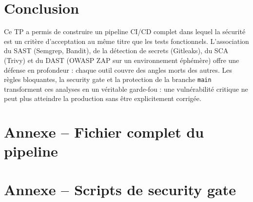 \documentclass[11pt,a4paper]{article}
\begin{document}
\section{Conclusion}

Ce TP a permis de construire un pipeline CI/CD complet dans lequel la sécurité est un critère
d'acceptation au même titre que les tests fonctionnels. L'association du SAST (Semgrep, Bandit), de
la détection de secrets (Gitleaks), du SCA (Trivy) et du DAST (OWASP ZAP sur un environnement
éphémère) offre une défense en profondeur : chaque outil couvre des angles morts des autres. Les
règles bloquantes, la security gate et la protection de la branche \texttt{main} transforment ces
analyses en un véritable garde-fou : une vulnérabilité critique ne peut plus atteindre la
production sans être explicitement corrigée.

\appendix
\section{Annexe -- Fichier complet du pipeline}


\section{Annexe -- Scripts de security gate}


\end{document}
